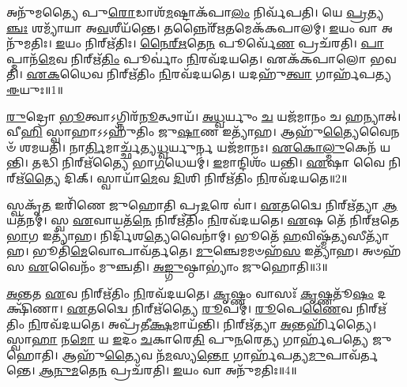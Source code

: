\clearpage
{}
\setcounter{anuvakam}{0}

𑌅𑌨𑍁᳴𑌮𑌤𑍍𑌯𑍈 𑌪𑍁\-\ul{𑌰𑍋}\-𑌡𑌾𑌶᳴\-\ul{𑌮}\-𑌷𑍍𑌟𑌾\-𑌕᳴𑌪𑌾\-\ul{𑌲𑌂} 𑌨𑌿𑌰𑍍𑌵᳴𑌪𑌤𑌿।
𑌯𑍇 \ul{𑌪𑍍𑌰}\-𑌤𑍍𑌯\-\ul{𑌞𑍍𑌚𑌃} 𑌶𑌮𑍍𑌯𑌾᳴𑌯𑌾 𑌅\-\ul{𑌵}\-𑌶𑍀𑌯᳴𑌨𑍍𑌤𑍇।
𑌤𑌨𑍍𑌨𑍈𑌰𑍍᳴\-\ul{𑌋}\-𑌤𑌮𑍇𑌕᳴𑌕𑌪𑌾𑌲𑌮𑍍।
\-\ul{𑌇}\-𑌯𑌂 𑌵𑌾 𑌅𑌨𑍁᳴𑌮𑌤𑌿𑌃।
\-\ul{𑌇}\-𑌯𑌂 𑌨𑌿𑌰𑍍\mbox{}𑌋᳴𑌤𑌿𑌃।
\-\ul{𑌨𑍈}\-\-\ul{𑌰𑍍}\-\-\ul{𑌋}\-𑌤𑍇\-\ul{𑌨} 𑌪𑍂𑌰𑍍𑌵𑍇᳴\-\ul{𑌣} 𑌪𑍍𑌰𑌚᳴𑌰𑌤𑌿।
\-\ul{𑌪𑌾}\-𑌪𑍍𑌮𑌾𑌨᳴\-\ul{𑌮𑍇}\-𑌵 𑌨𑌿𑌰𑍍\mbox{}𑌋᳴\-\ul{𑌤𑌿𑌂} 𑌪𑍂𑌰𑍍𑌵𑌾𑌂॑ \ul{𑌨𑌿}\-𑌰𑌵᳴𑌦𑌯𑌤𑍇।
𑌏𑌕᳴𑌕𑌪𑌾𑌲𑍋 𑌭𑌵𑌤𑌿।
\-\ul{𑌏}\-\-\ul{𑌕}\-𑌧𑍈𑌵 𑌨𑌿𑌰𑍍\mbox{}𑌋᳴𑌤𑌿𑌂 \ul{𑌨𑌿}\-𑌰𑌵᳴𑌦𑌯𑌤𑍇।
𑌯𑌦𑌹𑍁᳴\-\ul{𑌤𑍍𑌵𑌾} 𑌗𑌾𑌰𑍍\mbox{}𑌹᳴𑌪𑌤𑍍𑌯 \ul{𑌈}\-𑌯𑍁𑌃॥1॥

\-\ul{𑌰𑍁}\-𑌦𑍍𑌰𑍋 \ul{𑌭𑍂}\-𑌤𑍍𑌵𑌾\-𑌽𑌗𑍍𑌨𑌿𑌰᳴\-\ul{𑌨𑍂}\-𑌤𑍍𑌥𑌾𑌯᳴।
\-\ul{𑌅}\-\-\ul{𑌧𑍍𑌵}\-𑌰𑍍𑌯𑍁𑌂 \ul{𑌚} 𑌯𑌜᳴𑌮𑌾𑌨𑌂 𑌚 𑌹𑌨𑍍𑌯𑌾𑌤𑍍।
𑌵𑍀\-\ul{𑌹𑌿} 𑌸𑍍𑌵𑌾𑌹𑌾\-𑌽𑌽𑌹𑍁᳴𑌤𑌿𑌂 𑌜𑍁\-\ul{𑌷𑌾}\-𑌣 𑌇𑌤𑍍𑌯𑌾᳴𑌹।
𑌆𑌹𑍁᳴\-\ul{𑌤𑍍𑌯𑍈}\-𑌵𑍈𑌨𑍞᳴ 𑌶𑌮𑌯𑌤𑌿।
𑌨𑌾\-\ul{𑌰𑍍𑌤𑌿}\-𑌮𑌾𑌰𑍍𑌚𑍍𑌛᳴𑌤𑍍𑌯\-\ul{𑌧𑍍𑌵}\-𑌰𑍍𑌯𑍁𑌰𑍍𑌨 𑌯𑌜᳴𑌮𑌾𑌨𑌃।
\-\ul{𑌏}\-\-\ul{𑌕𑍋}\-\-\ul{𑌲𑍍𑌮𑍁}\-𑌕𑍇𑌨᳴ 𑌯𑌨𑍍𑌤𑌿।
𑌤𑌦𑍍𑌧𑌿 𑌨𑌿𑌰𑍍\mbox{}𑌋᳴𑌤𑍍𑌯𑍈 𑌭𑌾\-\ul{𑌗}\-𑌧𑍇𑌯𑌮𑍍॑।
\-\ul{𑌇}\-𑌮𑌾𑌨𑍍𑌦𑌿𑌶𑌂᳴ 𑌯𑌨𑍍𑌤𑌿।
\-\ul{𑌏}\-𑌷𑌾 𑌵𑍈 𑌨𑌿𑌰𑍍\mbox{}𑌋᳴\-\ul{𑌤𑍍𑌯𑍈} 𑌦𑌿𑌕𑍍।
𑌸𑍍𑌵𑌾𑌯𑌾᳴\-\ul{𑌮𑍇}\-𑌵 \ul{𑌦𑌿}\-𑌶𑌿 𑌨𑌿𑌰𑍍\mbox{}𑌋᳴𑌤𑌿𑌂 \ul{𑌨𑌿}\-𑌰𑌵᳴𑌦𑌯𑌤𑍇॥2॥

𑌸𑍍𑌵𑌕𑍃᳴\-\ul{𑌤} 𑌇𑌰𑌿᳴𑌣𑍇 𑌜𑍁𑌹𑍋𑌤𑌿 𑌪𑍍𑌰\-\ul{𑌦}\-𑌰𑍇 𑌵𑌾॑।
\-\ul{𑌏}\-𑌤𑌦𑍍𑌵𑍈 𑌨𑌿𑌰𑍍\mbox{}𑌋᳴𑌤𑍍𑌯𑌾 \ul{𑌆}\-𑌯𑌤᳴𑌨𑌮𑍍।
𑌸𑍍𑌵 \ul{𑌏}\-𑌵𑌾𑌯𑌤᳴\-\ul{𑌨𑍇} 𑌨𑌿𑌰𑍍\mbox{}𑌋᳴𑌤𑌿𑌂 \ul{𑌨𑌿}\-𑌰𑌵᳴𑌦𑌯𑌤𑍇।
\-\ul{𑌏}\-𑌷 𑌤𑍇᳴ 𑌨𑌿𑌰𑍍‌\mbox{}𑌋𑌤𑍇 \ul{𑌭𑌾}\-𑌗 𑌇𑌤𑍍𑌯𑌾᳴𑌹।
𑌨𑌿𑌰𑍍𑌦𑌿᳴𑌶\-\ul{𑌤𑍍𑌯𑍇}\-𑌵𑍈𑌨𑌾॑𑌮𑍍।
𑌭𑍂𑌤𑍇᳴ \ul{𑌹}\-𑌵𑌿𑌷𑍍𑌮᳴\-\ul{𑌤𑍍𑌯}\-𑌸𑍀𑌤𑍍𑌯𑌾᳴𑌹।
𑌭𑍂𑌤𑌿᳴\-\ul{𑌮𑍇}\-𑌵𑍋𑌪𑌾𑌵᳴𑌰𑍍𑌤𑌤𑍇।
\-\ul{𑌮𑍁}\-𑌞𑍍𑌚𑍇𑌮𑌮𑍞𑌹᳴\-\ul{𑌸} 𑌇𑌤𑍍𑌯𑌾᳴𑌹।
𑌅𑍞𑌹᳴𑌸 \ul{𑌏}\-𑌵𑍈𑌨𑌂᳴ 𑌮𑍁𑌞𑍍𑌚𑌤𑌿।
\-\ul{𑌅}\-\-\ul{𑌙𑍍𑌗𑍁}\-𑌷𑍍𑌠𑌾𑌭𑍍𑌯𑌾𑌂॑ 𑌜𑍁𑌹𑍋𑌤𑌿॥3॥

\-\ul{𑌅}\-\-\ul{𑌨𑍍𑌤}\-𑌤 \ul{𑌏}\-𑌵 𑌨𑌿𑌰𑍍\mbox{}𑌋᳴𑌤𑌿𑌂 \ul{𑌨𑌿}\-𑌰𑌵᳴𑌦𑌯𑌤𑍇।
\-\ul{𑌕𑍃}\-𑌷𑍍𑌣𑌂 𑌵𑌾𑌸𑌃᳴ \ul{𑌕𑍃}\-𑌷𑍍𑌣𑌤𑍂᳴\-\ul{𑌷𑌂} 𑌦𑌕𑍍𑌷𑌿᳴𑌣𑌾।
\-\ul{𑌏}\-𑌤𑌦𑍍𑌵𑍈 𑌨𑌿𑌰𑍍\mbox{}𑌋᳴𑌤𑍍𑌯𑍈 \ul{𑌰𑍂}\-𑌪𑌮𑍍।
\-\ul{𑌰𑍂}\-𑌪𑍇\-\ul{𑌣𑍈}\-𑌵 𑌨𑌿𑌰𑍍\mbox{}𑌋᳴𑌤𑌿𑌂 \ul{𑌨𑌿}\-𑌰𑌵᳴𑌦𑌯𑌤𑍇।
𑌅𑌪𑍍𑌰᳴𑌤𑍀\-\ul{𑌕𑍍𑌷}\-𑌮𑌾𑌯᳴𑌨𑍍𑌤𑌿।
𑌨𑌿𑌰𑍍\mbox{}𑌋᳴𑌤𑍍𑌯𑌾 \ul{𑌅}\-𑌨𑍍𑌤𑌰𑍍\mbox{}𑌹𑌿᳴𑌤𑍍𑌯𑍈।
𑌸𑍍𑌵𑌾\-\ul{𑌹𑌾} 𑌨\-\ul{𑌮𑍋} 𑌯 \ul{𑌇}\-𑌦𑌂 \ul{𑌚}\-𑌕𑌾𑌰𑍇\-\ul{𑌤𑌿} 𑌪𑍁\-\ul{𑌨}\-𑌰𑍇\-\ul{𑌤𑍍𑌯} 𑌗𑌾𑌰𑍍\mbox{}𑌹᳴𑌪𑌤𑍍𑌯𑍇 𑌜𑍁𑌹𑍋𑌤𑌿।
𑌆𑌹𑍁᳴\-\ul{𑌤𑍍𑌯𑍈}\-𑌵 𑌨᳴\-\ul{𑌮}\-𑌸𑍍𑌯\-\ul{𑌨𑍍𑌤𑍋} 𑌗𑌾𑌰𑍍\mbox{}𑌹᳴𑌪𑌤𑍍𑌯\-\ul{𑌮𑍁}\-𑌪𑌾𑌵᳴𑌰𑍍𑌤𑌨𑍍𑌤𑍇।
\-\ul{𑌆}\-\-\ul{𑌨𑍁}\-\-\ul{𑌮}\-𑌤𑍇\-\ul{𑌨} 𑌪𑍍𑌰𑌚᳴𑌰𑌤𑌿।
\-\ul{𑌇}\-𑌯𑌂 𑌵𑌾 𑌅𑌨𑍁᳴𑌮𑌤𑌿𑌃॥4॥

